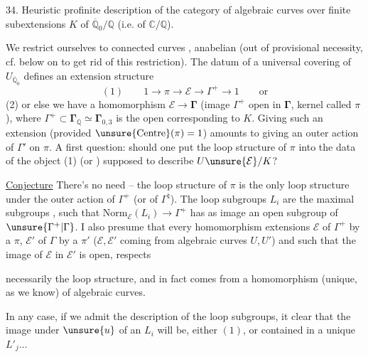 34. Heuristic profinite description of the category
of algebraic curves  over  finite
subextensions $K$ of $\overline{\mathbb Q}_0/\mathbb Q$ (i.e. of $\mathbb C/\mathbb Q$).

We restrict ourselves to  connected curves , anabelian
(out of provisional necessity\unsure{!}, cf. below on  to
get rid of this restriction). The datum of
a universal covering of  $U_{\overline{\mathbb Q}_0}$ defines an
extension structure
\[
(1)\qquad 1\longrightarrow\pi\longrightarrow\mathcal E\longrightarrow\Gamma^{+}\longrightarrow1\qquad\text{or}
\]
(2) or else we have a homomorphism $\mathcal E\longrightarrow\boldsymbol{\Gamma}$
(image $\Gamma^{+}$ open in $\boldsymbol{\Gamma}$,
kernel called $\pi$),
where $\Gamma^{+}\subset\boldsymbol{\Gamma}_{\mathbb Q}\simeq\boldsymbol{\Gamma}_{0,3}$ is the open 
corresponding to $K$. Giving such an
extension (provided $\unsure{\mathrm{Centre}}(\pi)=1$) amounts to
giving an outer action of $\Gamma'$ on $\pi$.
A first question: should one put the
loop structure of $\pi$ into the  data  of
the object (1) (or ) supposed to describe $U\unsure{\mathcal E}/K$?

\uline{Conjecture} There's no need -- the loop structure
of $\pi$ is the only loop structure 
under the outer action of $\Gamma^{+}$ (or of $\Gamma^{\natural}$). The
loop subgroups $L_i$ are the maximal
subgroups , such that $\mathrm{Norm}_{\mathcal E}(L_i)\longrightarrow\Gamma^{+}$ has
as image an open subgroup of $\unsure{\Gamma^{+}|\Gamma}$.
I
also presume that every homomorphism  extensions
$\mathcal E$ of $\Gamma^{+}$ by a $\pi$, $\mathcal E'$ of $\Gamma$ by a $\pi'$
($\mathcal E,\mathcal E'$ coming from algebraic curves $U,U'$) and such
that the image of $\mathcal E$ in $\mathcal E'$ is open, respects

necessarily the loop structure, and in fact
comes from a homomorphism (unique, as we know) of algebraic
curves.

In any case, if we admit the description of the
loop subgroups, it  clear that the image under
$\unsure{u}$ of an $L_i$ will be, either $(1)$, or contained
in a unique $L'_j\ldots$

